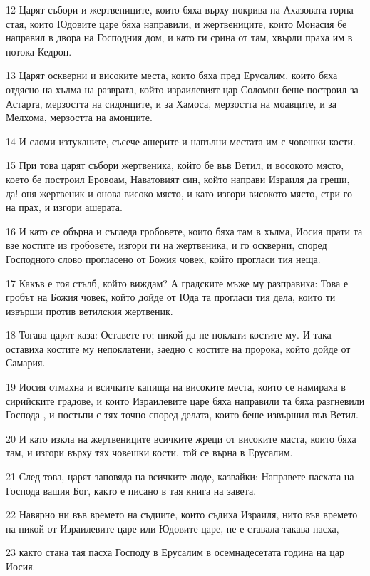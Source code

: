\par 12 Царят събори и жертвениците, които бяха върху покрива на Ахазовата горна стая, които Юдовите царе бяха направили, и жертвениците, които Монасия бе направил в двора на Господния дом, и като ги срина от там, хвърли праха им в потока Кедрон.
\par 13 Царят оскверни и високите места, които бяха пред Ерусалим, които бяха отдясно на хълма на разврата, който израилевият цар Соломон беше построил за Астарта, мерзостта на сидонците, и за Хамоса, мерзостта на моавците, и за Мелхома, мерзостта на амонците.
\par 14 И сломи изтуканите, съсече ашерите и напълни местата им с човешки кости.
\par 15 При това царят събори жертвеника, който бе във Ветил, и восокото място, което бе построил Еровоам, Наватовият син, който направи Израиля да греши, да! оня жертвеник и онова високо място, и като изгори високото място, стри го на прах, и изгори ашерата.
\par 16 И като се обърна и съгледа гробовете, които бяха там в хълма, Иосия прати та взе костите из гробовете, изгори ги на жертвеника, и го оскверни, според Господното слово прогласено от Божия човек, който прогласи тия неща.
\par 17 Какъв е тоя стълб, който виждам? А градските мъже му разправиха: Това е гробът на Божия човек, който дойде от Юда та прогласи тия дела, които ти извърши против ветилския жертвеник.
\par 18 Тогава царят каза: Оставете го; никой да не поклати костите му. И така оставиха костите му непоклатени, заедно с костите на пророка, който дойде от Самария.
\par 19 Иосия отмахна и всичките капища на високите места, които се намираха в сирийските градове, и които Израилевите царе бяха направили та бяха разгневили Господа , и постъпи с тях точно според делата, които беше извършил във Ветил.
\par 20 И като изкла на жертвениците всичките жреци от високите маста, които бяха там, и изгори върху тях човешки кости, той се върна в Ерусалим.
\par 21 След това, царят заповяда на всичките люде, казвайки: Направете пасхата на Господа вашия Бог, както е писано в тая книга на завета.
\par 22 Навярно ни във времето на съдиите, които съдиха Израиля, нито във времето на никой от Израилевите царе или Юдовите царе, не е ставала такава пасха,
\par 23 както стана тая пасха Господу в Ерусалим в осемнадесетата година на цар Иосия.
